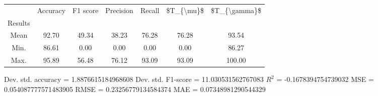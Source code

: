 \begin{tabular}{|c|c|c|c|c|c|c|}
\toprule
{} &  Accuracy &  F1 score &  Precision &  Recall &  \$T\_\{\textbackslash mu\}\$ &  \$T\_\{\textbackslash gamma\}\$ \\
Results &           &           &            &         &            &               \\
\hline
Mean    &     92.70 &     49.34 &      38.23 &   76.28 &      76.28 &         93.54 \\
Min.    &     86.61 &      0.00 &       0.00 &    0.00 &       0.00 &         86.27 \\
Max.    &     95.89 &     56.48 &      76.12 &   93.09 &      93.09 &        100.00 \\
\bottomrule
\end{tabular}

 Dev. std. accuracy = 1.8876615184968608
 Dev. std. F1-score = 11.030531562767083
 $R^2$ = -0.1678394754739032
 MSE = 0.054087777571483905
 RMSE = 0.23256779134584374
 MAE = 0.07348981290544329